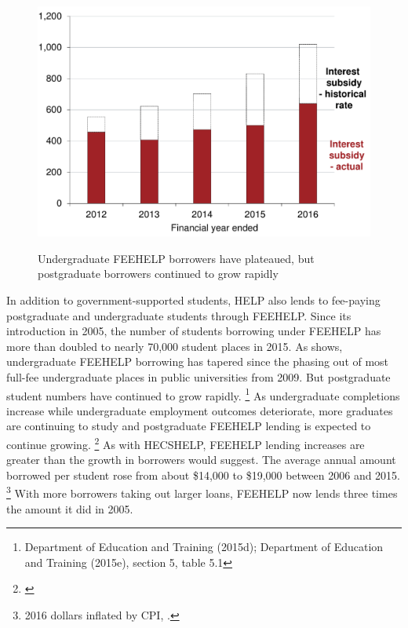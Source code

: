 \documentclass[embargoed]{grattan}
\begin{document}
\begin{figure}
\caption[Undergraduate FEE-HELP borrowers have plateaued, but postgraduate borrowers continued to grow rapidly]{Undergraduate \gls{FEEHELP} borrowers have plateaued, but postgraduate borrowers continued to grow rapidly}\label{fig:fig5-undergrad-HELP-borrowers-have-plateaued-but-postgrad-borrowers-continued-to-grow-rapidly}

\includegraphics[page=5]{atlas/Chartpack.pdf}
%
{\textcites{EducationvariousyearsSelectedhighereducation}{EducationvariousyearsHighereducationreport}}
\end{figure}

In addition to government-supported students, \gls{HELP} also lends to fee-paying postgraduate and undergraduate students through \gls{FEEHELP}.
Since its introduction in 2005, the number of students borrowing under \gls{FEEHELP} has more than doubled to nearly 70,000 student places in 2015.
As  shows, undergraduate \gls{FEEHELP} borrowing has tapered since the phasing out of most full-fee undergraduate places in public universities from 2009.
But postgraduate student numbers have continued to grow rapidly.%
\footnote{Department of Education and Training (2015d); Department of Education and Training (2015e), section 5, table 5.1} As undergraduate completions increase while undergraduate employment outcomes deteriorate, more graduates are continuing to study and postgraduate \gls{FEEHELP} lending is expected to continue growing.%
\footnote{\textcites{Norton2016MappingAustralianhigher}{Education2016uCubeHighereducation}}
As with \gls{HECSHELP}, \gls{FEEHELP} lending increases are greater than the growth in borrowers would suggest.
The average annual amount borrowed per student rose from about \$14,000 to \$19,000 between 2006 and 2015.%
\footnote{2016 dollars inflated by \gls{CPI}, \textcite{ABS2016ConsumerPriceIndex}.} With more borrowers taking out larger loans, \gls{FEEHELP} now lends three times the amount it did in 2005.
\end{document}
